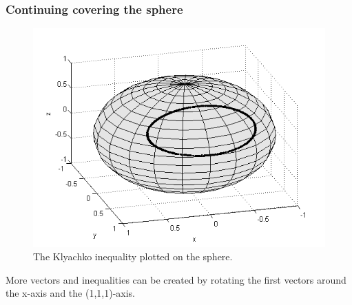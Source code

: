 \documentclass[•]{beamer}
\theoremstyle{remark}
\begin{document}
\begin{frame}[shrink=20]\frametitle{Continuing covering the sphere}

\begin{figure}[h!]
\begin{center}
\includegraphics[scale=0.6]{ine1.png}
\caption{The Klyachko inequality plotted on the sphere.}
\end{center}
\end{figure}
\end{frame}
\begin{frame}[shrink=10]
\begin{block}

More vectors and inequalities can be created by rotating the first vectors around the x-axis and the (1,1,1)-axis.
\end{block}
\end{frame}
\end{document}
